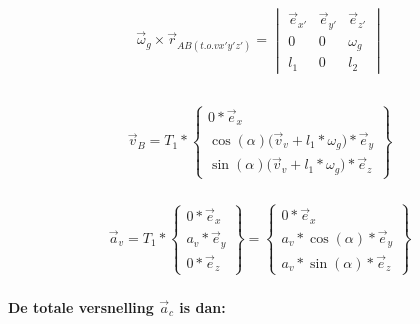 \documentclass[a4paper,10pt]{article}
\begin{document}
\begin{equation}
	\begin{aligned}
		\vec{\omega}_g \times \vec{r}_{AB(t.o.v x'y'z')} =  \begin{vmatrix}
			\vec{e}_{x'}& \vec{e}_{y'} & \vec{e}_{z'}\\
			0 & 0 &  \omega_g \\		
			l_1 & 0 & l_2
		\end{vmatrix}\\
	\end{aligned}
\end{equation}\\
\begin{equation}
	\begin{aligned}
		\vec{v}_B = {T}_{1}* \begin{Bmatrix}
			{0*\vec{e}_{x}}\\
			\cos(\alpha)\Big(\vec{v}_v + l_1*\omega_g \Big)*\vec{e}_{y}\\
			\sin(\alpha)\Big(\vec{v}_v + l_1*\omega_g\Big)*\vec{e}_{z} 
		\end{Bmatrix}
	\end{aligned}
\end{equation}\\
\begin{equation}
	\begin{aligned}
		\vec{a}_v = {T}_{1}* \begin{Bmatrix}
			{0*\vec{e}_{x}}\\
			a_v*\vec{e}_{y}\\
			0*\vec{e}_{z} 
		\end{Bmatrix} = \begin{Bmatrix}
		{0*\vec{e}_{x}}\\
		a_v*\cos(\alpha)*\vec{e}_{y}\\
		a_v*\sin(\alpha)*\vec{e}_{z} 
	\end{Bmatrix}
\end{aligned}
\end{equation}\\
\textbf{De totale versnelling $\vec{a}_c$ is dan:}
\end{document}
